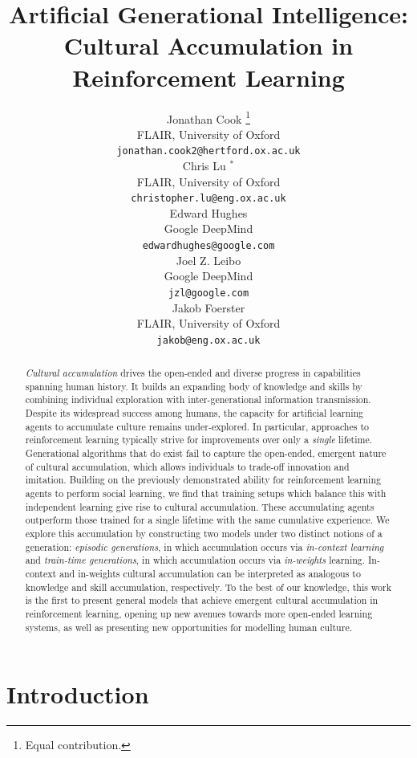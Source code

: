 \documentclass{article}
\title{Artificial Generational Intelligence: Cultural Accumulation in Reinforcement Learning}
\author{%
  Jonathan Cook \thanks{Equal contribution.} \\
  FLAIR, University of Oxford\\
  \texttt{jonathan.cook2@hertford.ox.ac.uk} \\
  \And
  Chris Lu $^*$ \\
  FLAIR, University of Oxford \\
  \texttt{christopher.lu@eng.ox.ac.uk} \\
  \AND
  Edward Hughes \\
  Google DeepMind\\
  \texttt{edwardhughes@google.com} \\
  \And
  Joel Z. Leibo \\
  Google DeepMind\\
  \texttt{jzl@google.com} \\
  \And
  Jakob Foerster \\
  FLAIR, University of Oxford\\
  \texttt{jakob@eng.ox.ac.uk} \\
}
\begin{document}
\maketitle


\begin{abstract}
\textit{Cultural accumulation} drives the open-ended and diverse progress in capabilities spanning human history. It builds an expanding body of knowledge and skills by combining individual exploration with inter-generational information transmission. Despite its widespread success among humans, the capacity for artificial learning agents to accumulate culture remains under-explored. In particular, approaches to reinforcement learning typically strive for improvements over only a \textit{single} lifetime. Generational algorithms that do exist fail to capture the open-ended, emergent nature of cultural accumulation, which allows individuals to trade-off innovation and imitation. Building on the previously demonstrated ability for reinforcement learning agents to perform social learning, we find that training setups which balance this with independent learning give rise to cultural accumulation. These accumulating agents outperform those trained for a single lifetime with the same cumulative experience. We explore this accumulation by constructing two models under two distinct notions of a generation: \textit{episodic generations}, in which accumulation occurs via \textit{in-context learning} and \textit{train-time generations}, in which accumulation occurs via \textit{in-weights} learning. In-context and in-weights cultural accumulation can be interpreted as analogous to knowledge and skill accumulation, respectively. To the best of our knowledge, this work is the first to present general models that achieve emergent cultural accumulation in reinforcement learning, opening up new avenues towards more open-ended learning systems, as well as presenting new opportunities for modelling human culture.
\end{abstract}


\section{Introduction}
\end{document}
